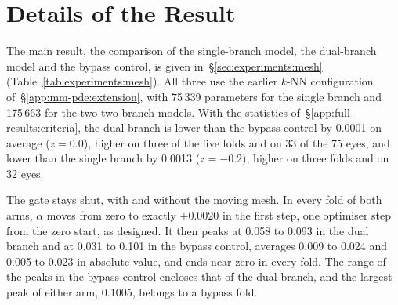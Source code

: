 \section{Details of the Result}
\label{app:mm-pde:result}

The main result, the comparison of the single-branch model, the
dual-branch model and the bypass control, is given
in~\S\ref{sec:experiments:mesh} (Table~\ref{tab:experiments:mesh}). All
three use the earlier $k$-NN configuration of~\S\ref{app:mm-pde:extension},
with 75\,339 parameters for the single branch and 175\,663 for the two
two-branch models. With the statistics of~\S\ref{app:full-results:criteria},
the dual branch is lower than the bypass control by 0.0001 on average
($z = 0.0$), higher on three of the five folds and on 33 of the 75 eyes,
and lower than the single branch by 0.0013 ($z = -0.2$), higher on three
folds and on 32 eyes.

The gate stays shut, with and without the moving mesh. In every fold of
both arms, $\alpha$ moves from zero to exactly $\pm 0.0020$ in the first
step, one optimiser step from the zero start, as designed. It then peaks at
0.058 to 0.093 in the dual branch and at 0.031 to 0.101 in the bypass
control, averages 0.009 to 0.024 and 0.005 to 0.023 in absolute value, and
ends near zero in every fold. The range of the peaks in the bypass control
encloses that of the dual branch, and the largest peak of either arm,
0.1005, belongs to a bypass fold.

